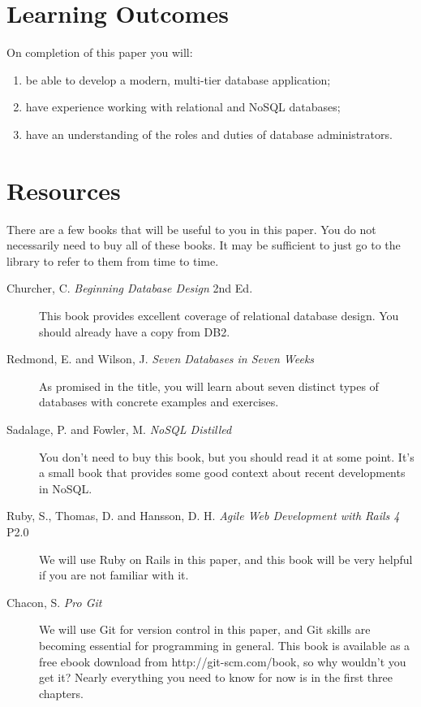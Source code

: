\documentclass{article}
\begin{document}
\section*{Learning Outcomes}
On completion of this paper you will:
\begin{enumerate}
  \item be able to develop a modern, multi-tier database application;
  \item have experience working with relational and NoSQL databases;
  \item have an understanding of the roles and duties of database administrators.
\end{enumerate}
\newpage

\section*{Resources}
There are a few books that will be useful to you in this paper.  You do not necessarily need to buy all of these books.  It may be sufficient to just go to the library to refer to them from time to time.


\begin{description}
 \item [Churcher, C. \emph{Beginning Database Design} 2nd Ed.] This book provides excellent coverage of relational database design.  You should already have a copy from DB2.
 \item [Redmond, E. and Wilson, J. \emph{Seven Databases in Seven Weeks}] As promised in the title, you will learn about seven distinct types of databases with concrete examples and exercises.
 \item [Sadalage, P. and Fowler, M. \emph{NoSQL Distilled}] You don't need to buy this book, but you should read it at some point.  It's a small book that provides some good context about recent developments in NoSQL.
 \item[Ruby, S., Thomas, D. and Hansson, D. H. \emph{Agile Web Development with Rails 4} P2.0] We will use Ruby on Rails in this paper, and this book will be very helpful if you are not familiar with it. 
 \item[Chacon, S. \emph{Pro Git}] We will use Git for version control in this paper, and Git skills are becoming essential for programming in general.  This book is available as a free ebook download from http://git-scm.com/book, so why wouldn't you get it?  Nearly everything you need to know for now is in the first three chapters.
\end{description}
\end{document}
